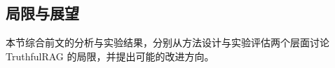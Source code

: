 
\subsection{局限与展望}
\label{sec:cl-discussion}

本节综合前文的分析与实验结果，分别从方法设计与实验评估两个层面讨论 TruthfulRAG 的局限，并提出可能的改进方向。


